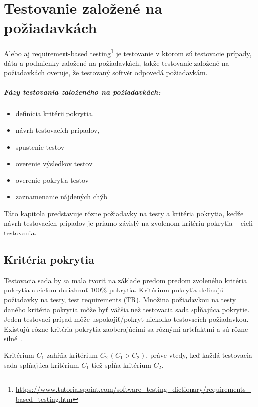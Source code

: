 \chapter{Testovanie založené na požiadavkách}
\label{requirements_based_testing}
Alebo aj requirement-based testing\footnote{\url{https://www.tutorialspoint.com/software_testing_dictionary/requirements_based_testing.htm}} je testovanie v ktorom sú testovacie prípady, dáta a podmienky založené na požiadavkách, takže testovanie založené na požiadavkách overuje, že testovaný softvér odpovedá požiadavkám.

\paragraph{Fázy testovania založeného na požiadavkách:}
\begin{itemize}
	\item definícia kritérii pokrytia,
	\item návrh testovacích prípadov,
	\item spustenie testov
	\item overenie výsledkov testov
	\item overenie pokrytia testov
	\item zaznamenanie nájdených chýb
\end{itemize}

Táto kapitola predstavuje rôzne požiadavky na testy a kritéria pokrytia, keďže návrh testovacích prípadov je priamo závislý na zvolenom kritériu pokrytia -- cieli testovania.


\section{Kritéria pokrytia}
\label{krietria_pokrytia}
Testovacia sada by sa mala tvoriť na základe predom predom zvoleného kritéria pokrytia s cieľom dosiahnuť 100\% pokrytia. 
Kritérium pokrytia definujú požiadavky na testy, test requirements (TR).
Množina požiadavkou na testy daného kritéria pokrytia môže byť väčšia než testovacia sada spĺňajúca pokrytie.
Jeden testovací prípad môže uspokojiť/pokryť niekoľko testovacích požiadavkou.
Existujú rôzne kritéria pokrytia zaoberajúcimi sa rôznými artefaktmi a sú rôzne silné~\cite{Smrcka}.

\begin{definition}
Kritérium $C_1$ zahŕňa kritérium $C_2 \,(C_1 > C_2)$, práve vtedy, keď každá testovacia sada splňajúca kritérium $C_1$ tiež spĺňa kritérium $C_2$.
\end{definition}

